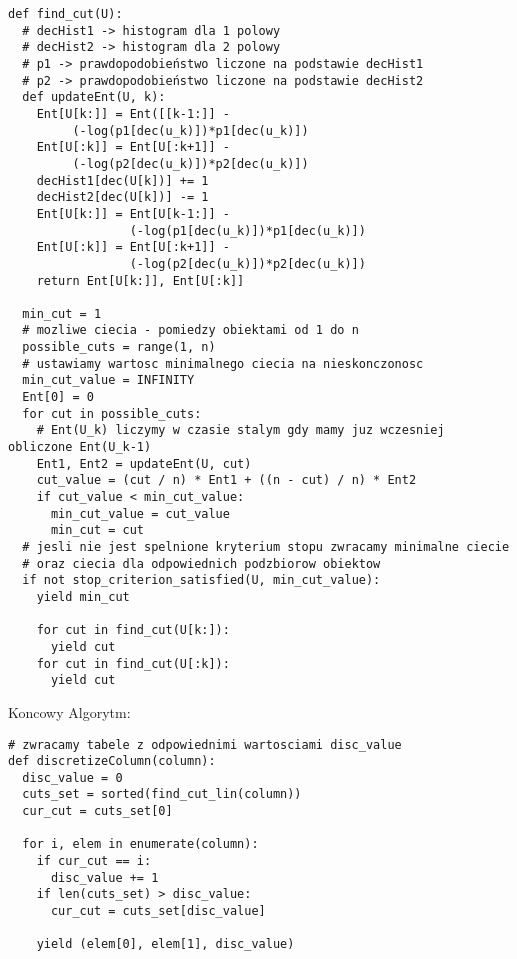 \documentclass[magisterska]{pracamgr}
\theoremstyle{plain}
\theoremstyle{definition}
\theoremstyle{remark}
\begin{document}
\begin{lstlisting}
def find_cut(U):
  # decHist1 -> histogram dla 1 polowy
  # decHist2 -> histogram dla 2 polowy
  # p1 -> prawdopodobieństwo liczone na podstawie decHist1
  # p2 -> prawdopodobieństwo liczone na podstawie decHist2
  def updateEnt(U, k):
    Ent[U[k:]] = Ent([[k-1:]] - 
		 (-log(p1[dec(u_k)])*p1[dec(u_k)])
    Ent[U[:k]] = Ent[U[:k+1]] - 
		 (-log(p2[dec(u_k)])*p2[dec(u_k)])
    decHist1[dec(U[k])] += 1    
    decHist2[dec(U[k])] -= 1
    Ent[U[k:]] = Ent[U[k-1:]] - 
                 (-log(p1[dec(u_k)])*p1[dec(u_k)])
    Ent[U[:k]] = Ent[U[:k+1]] - 
                 (-log(p2[dec(u_k)])*p2[dec(u_k)])
    return Ent[U[k:]], Ent[U[:k]]
    
  min_cut = 1
  # mozliwe ciecia - pomiedzy obiektami od 1 do n
  possible_cuts = range(1, n)
  # ustawiamy wartosc minimalnego ciecia na nieskonczonosc
  min_cut_value = INFINITY
  Ent[0] = 0
  for cut in possible_cuts:
    # Ent(U_k) liczymy w czasie stalym gdy mamy juz wczesniej obliczone Ent(U_k-1)
    Ent1, Ent2 = updateEnt(U, cut)
    cut_value = (cut / n) * Ent1 + ((n - cut) / n) * Ent2
    if cut_value < min_cut_value:
      min_cut_value = cut_value
      min_cut = cut	
  # jesli nie jest spelnione kryterium stopu zwracamy minimalne ciecie
  # oraz ciecia dla odpowiednich podzbiorow obiektow
  if not stop_criterion_satisfied(U, min_cut_value):
    yield min_cut
    
    for cut in find_cut(U[k:]):
      yield cut 
    for cut in find_cut(U[:k]):
      yield cut
\end{lstlisting}
Koncowy Algorytm:
\begin{lstlisting}
# zwracamy tabele z odpowiednimi wartosciami disc_value
def discretizeColumn(column):
  disc_value = 0
  cuts_set = sorted(find_cut_lin(column))
  cur_cut = cuts_set[0]

  for i, elem in enumerate(column):
    if cur_cut == i:
      disc_value += 1
    if len(cuts_set) > disc_value:
      cur_cut = cuts_set[disc_value]

    yield (elem[0], elem[1], disc_value)
\end{lstlisting}
\end{document}
